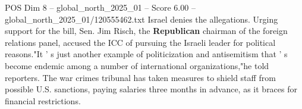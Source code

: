 \begin{textsample}{POS Dim 8 – global\_north\_2025\_01 – Score 6.00 – global\_north\_2025\_01/120555462.txt}
Israel denies the allegations.
Urging support for the bill, Sen.
Jim Risch, the \textbf{Republican} chairman of the foreign relations panel, accused the ICC of pursuing the Israeli leader for political reasons."It ' s just another example of politicization and antisemitism that ' s become endemic among a number of international organizations,"he told reporters.
The war crimes tribunal has taken measures to shield staff from possible U.S. sanctions, paying salaries three months in advance, as it braces for financial restrictions.

\end{textsample}
